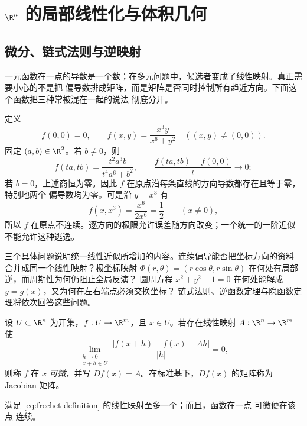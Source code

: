 \section{\texorpdfstring{$\R^n$}{R n} 的局部线性化与体积几何}\label{sec:02-04}

\subsection{\Frechet{} 微分、链式法则与逆映射}\label{subsec:2-4-1}

一元函数在一点的导数是一个数；在多元问题中，候选者变成了线性映射。真正需要小心的不是把
偏导数排成矩阵，而是矩阵是否同时控制所有趋近方向。下面这个函数把三种常被混在一起的说法
彻底分开。

\begin{example}\label{ex:2-4-1-1}
定义
\[
 f(0,0)=0,\qquad
 f(x,y)=\frac{x^3y}{x^6+y^2}\quad ((x,y)\ne(0,0)).
\]
固定 $(a,b)\in\R^2$。若 $b\ne0$，则
\[
 f(ta,tb)=\frac{t^2a^3b}{t^4a^6+b^2},\qquad
 \frac{f(ta,tb)-f(0,0)}{t}\longrightarrow0;
\]
若 $b=0$，上述商恒为零。因此 $f$ 在原点沿每条直线的方向导数都存在且等于零，特别地两个
偏导数均为零。可是沿 $y=x^3$ 有
\[
 f(x,x^3)=\frac{x^6}{2x^6}=\frac12\qquad(x\ne0),
\]
所以 $f$ 在原点不连续。逐方向的极限允许误差随方向改变；一个统一的一阶近似不能允许这种逃逸。
\end{example}

三个具体问题说明统一线性近似所增加的内容。连续偏导能否把坐标方向的资料
合并成同一个线性映射？极坐标映射
$\Phi(r,\theta)=(r\cos\theta,r\sin\theta)$ 在何处有局部逆，而周期性为何仍阻止全局反演？
圆周方程 $x^2+y^2-1=0$ 在何处能解成 $y=g(x)$，又为何在左右端点必须交换坐标？
链式法则、逆函数定理与隐函数定理将依次回答这些问题。

\begin{definition}[\Frechet{} 微分]\label{def:2-4-1-1}
设 $U\subset\R^n$ 为开集，$f:U\to\R^m$，且 $x\in U$。若存在线性映射
$A:\R^n\to\R^m$ 使
\[
 \lim_{\substack{h\to0\\x+h\in U}}
 \frac{|f(x+h)-f(x)-Ah|}{|h|}=0,
 \tag{2.4.1}\label{eq:frechet-definition}
\]
则称 $f$ 在 $x$ \emph{\Frechet{} 可微}，并写 $Df(x)=A$。在标准基下，$Df(x)$ 的矩阵称为
Jacobian 矩阵。
\end{definition}

\begin{lemma}[微分的唯一性与连续性]\label{lemma:2-4-1-derivative-unique-continuous}
满足 \eqref{eq:frechet-definition} 的线性映射至多一个；而且，函数在一点 \Frechet{} 可微便在该点
连续。
\end{lemma}

